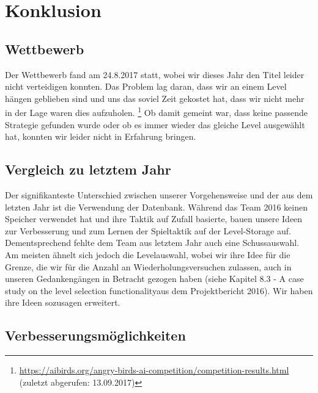 \section{Konklusion}

\subsection{Wettbewerb}
Der Wettbewerb fand am 24.8.2017 statt, wobei wir dieses Jahr den Titel leider nicht verteidigen konnten. Das Problem lag daran, dass wir an einem Level hängen geblieben sind und uns das soviel Zeit gekostet hat, dass wir nicht mehr in der Lage waren dies aufzuholen. \footnote{\url{https://aibirds.org/angry-birds-ai-competition/competition-results.html} (zuletzt abgerufen: 13.09.2017)} Ob damit gemeint war, dass keine passende Strategie gefunden wurde oder ob es immer wieder das gleiche Level ausgewählt hat, konnten wir leider nicht in Erfahrung bringen.

\subsection{Vergleich zu letztem Jahr}
Der signifikanteste Unterschied zwischen unserer Vorgehensweise und der aus dem letzten Jahr ist die Verwendung der Datenbank. Während das Team 2016 keinen Speicher verwendet hat und ihre Taktik auf Zufall basierte, bauen unsere Ideen zur Verbesserung und zum Lernen der Spieltaktik auf der Level-Storage auf. Dementsprechend fehlte dem Team aus letztem Jahr auch eine Schussauswahl. \\
Am meisten ähnelt sich jedoch die Levelauswahl, wobei wir ihre Idee für die Grenze, die wir für die Anzahl an Wiederholungsversuchen zulassen, auch in unseren Gedankengängen in Betracht gezogen haben (siehe Kapitel 8.3 - \glqq A case study on the level selection functionality\grqq aus dem Projektbericht 2016). Wir haben ihre Ideen sozusagen erweitert.

\subsection{Verbesserungsmöglichkeiten}
